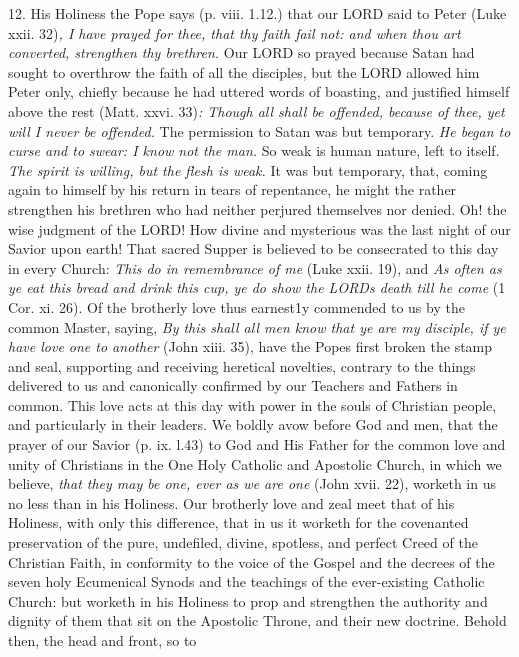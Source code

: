 12. His Holiness the Pope says (p. viii. 1.12.) that our LORD said to
Peter (Luke xxii. 32)\emph{, I have prayed for thee, that thy faith fail
not: and when thou art converted, strengthen thy brethren.} Our LORD so
prayed because Satan had sought to overthrow the faith of all the
disciples, but the LORD allowed him Peter only, chiefly because he had
uttered words of boasting, and justified himself above the rest (Matt.
xxvi. 33)\emph{: Though all shall be offended, because of thee, yet will
I never be offended.} The permission to Satan was but temporary.
\emph{He began to curse and to swear: I know not the man.} So \emph{}
weak is human nature, left to itself. \emph{The spirit is willing, but
the flesh is weak.} It was but temporary, that, coming again to himself
by his return in tears of repentance, he might the rather strengthen his
brethren who had neither perjured themselves nor denied. Oh! the wise
judgment of the LORD! How divine and mysterious was the last night of
our Savior upon earth! That sacred Supper is believed to be consecrated
to this day in every Church: \emph{This do in remembrance of me} (Luke
xxii. 19), and \emph{As often as} \emph{ye eat this bread and drink this
cup, ye do show the LORD\textquotesingle s death till he come} (1 Cor.
xi. 26). Of the brotherly love thus earnest1y commended to us by the
common Master, saying, \emph{By this shall all men know that ye are my
disciple, if ye have love one to another} (John xiii. 35), have the
Popes first broken the stamp and seal, supporting and receiving
heretical novelties, contrary to the things delivered to us and
canonically confirmed by our Teachers and Fathers in common. This love
acts at this day with power in the souls of Christian people, and
particularly in their leaders. We boldly avow before God and men, that
the prayer of our Savior (p. ix. l.43) to God and His Father for the
common love and unity of Christians in the One Holy Catholic and
Apostolic Church, in which we believe, \emph{that they may be one, ever
as we are one} (John xvii. 22), worketh in us no less than in his
Holiness. Our brotherly love and zeal meet that of his Holiness, with
only this difference, that in us it worketh for the covenanted
preservation of the pure, undefiled, divine, spotless, and perfect Creed
of the Christian Faith, in conformity to the voice of the Gospel and the
decrees of the seven holy Ecumenical Synods and the teachings of the
ever-existing Catholic Church: but worketh in his Holiness to prop and
strengthen the authority and dignity of them that sit on the Apostolic
Throne, and their new doctrine. Behold then, the head and front, so to
